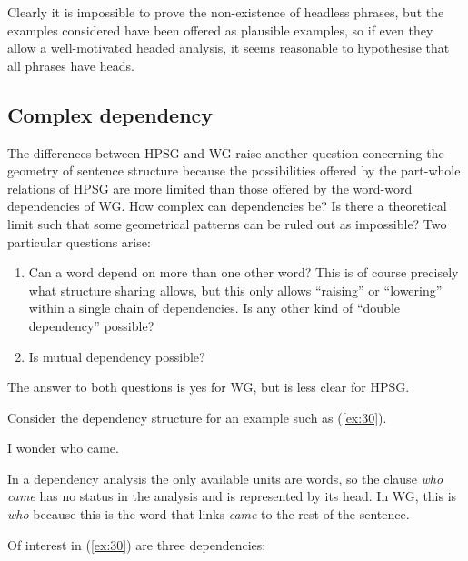 \documentclass[output=paper]{langscibook}
\begin{document}
Clearly it is impossible to prove the non-existence of headless phrases, but the examples considered have been offered as plausible examples, so if even they allow a well-motivated headed analysis, it seems reasonable to hypothesise that all phrases have heads.


\subsection{Complex dependency}
\label{sec:5.2}

The differences between HPSG and WG raise another question concerning the geometry of sentence structure because the possibilities offered by the part-whole relations of HPSG are more limited than those offered by the word-word dependencies of WG. How complex can dependencies be? Is there a theoretical limit such that some geometrical patterns can be ruled out as impossible? Two particular questions arise:

\begin{enumerate}
	\item \label{it:4} Can a word depend on more than one other word? This is of course precisely what structure sharing allows, but this only allows ``raising'' or ``lowering'' within a single chain of dependencies. Is any other kind of ``double dependency'' possible?
	
	\item \label{it:5} Is mutual dependency possible?
\end{enumerate}

The answer to both questions is yes for WG, but is less clear for HPSG.

Consider the dependency structure for an example such as (\ref{ex:30}).

\begin{exe}
	\ex \label{ex:30} I wonder who came.
\end{exe}
	
In a dependency analysis the only available units are words, so the clause \emph{who came} has no status in the analysis and is represented by its head. In WG, this is \emph{who} because this is the word that links \emph{came} to the rest of the sentence.

Of interest in (\ref{ex:30}) are three dependencies:
\end{document}
